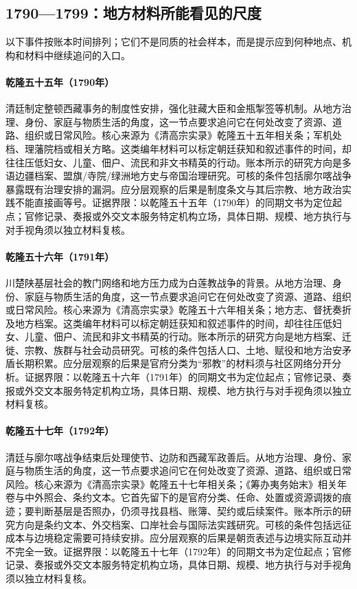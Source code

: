 \subsection{1790—1799：地方材料所能看见的尺度}
以下事件按账本时间排列；它们不是同质的社会样本，而是提示应到何种地点、机构和材料中继续追问的入口。
\hypertarget{social:EQ-1790-IMPERIAL-REGULATIONS-TIBET}{}\paragraph{乾隆五十五年（1790年）}清廷制定整顿西藏事务的制度性安排，强化驻藏大臣和金瓶掣签等机制。从地方治理、身份、家庭与物质生活的角度，这一节点要求追问它在何处改变了资源、道路、组织或日常风险。核心来源为《清高宗实录》乾隆五十五年相关条；军机处档、理藩院档或相关方略。这类编年材料可以标定朝廷获知和叙述事件的时间，却往往压低妇女、儿童、佃户、流民和非文书精英的行动。账本所示的研究方向是多语边疆档案、盟旗/寺院/绿洲地方史与帝国治理研究。可核的条件包括廓尔喀战争暴露既有治理安排的漏洞。应分层观察的后果是制度条文与其后宗教、地方政治实践不能直接画等号。证据界限：以乾隆五十五年（1790年）的同期文书为定位起点；官修记录、奏报或外交文本服务特定机构立场，具体日期、规模、地方执行与对手视角须以独立材料复核。
\hypertarget{social:EQ-1791-WHITE-LOTUS-PRECURSORS}{}\paragraph{乾隆五十六年（1791年）}川楚陕基层社会的教门网络和地方压力成为白莲教战争的背景。从地方治理、身份、家庭与物质生活的角度，这一节点要求追问它在何处改变了资源、道路、组织或日常风险。核心来源为《清高宗实录》乾隆五十六年相关条；地方志、督抚奏折及地方档案。这类编年材料可以标定朝廷获知和叙述事件的时间，却往往压低妇女、儿童、佃户、流民和非文书精英的行动。账本所示的研究方向是地方档案、迁徙、宗教、族群与社会动员研究。可核的条件包括人口、土地、赋役和地方治安矛盾长期积累。应分层观察的后果是官府分类为“邪教”的材料须与社区网络分开分析。证据界限：以乾隆五十六年（1791年）的同期文书为定位起点；官修记录、奏报或外交文本服务特定机构立场，具体日期、规模、地方执行与对手视角须以独立材料复核。
\hypertarget{social:EQ-1792-GURKHA-SETTLEMENT}{}\paragraph{乾隆五十七年（1792年）}清廷与廓尔喀战争结束后处理使节、边防和西藏军政善后。从地方治理、身份、家庭与物质生活的角度，这一节点要求追问它在何处改变了资源、道路、组织或日常风险。核心来源为《清高宗实录》乾隆五十七年相关条；《筹办夷务始末》相关年卷与中外照会、条约文本。它首先留下的是官府分类、任命、处置或资源调拨的痕迹；要判断基层是否照办，仍须寻找县档、账簿、契约或后续案件。账本所示的研究方向是条约文本、外交档案、口岸社会与国际法实践研究。可核的条件包括远征成本与边境稳定需要可持续安排。应分层观察的后果是朝贡表述与边境实际互动并不完全一致。证据界限：以乾隆五十七年（1792年）的同期文书为定位起点；官修记录、奏报或外交文本服务特定机构立场，具体日期、规模、地方执行与对手视角须以独立材料复核。
